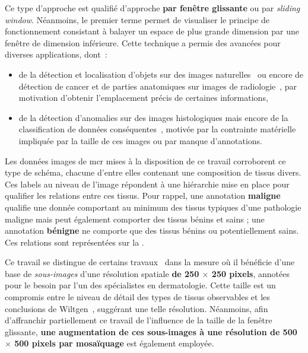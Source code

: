 Ce type d'approche est qualifié d'approche \textbf{par fenêtre glissante} ou par \textit{sliding window}. Néanmoins, le premier terme permet de visualiser le principe de fonctionnement consistant à balayer un espace de plus grande dimension par une fenêtre de dimension inférieure. Cette technique a permis des avancées pour diverses applications, dont~:~
\begin{itemize}
    \item de la détection et localisation d'objets sur des images naturelles~\cite{Harzallah2009} ou encore de détection de cancer et de parties anatomiques sur images de radiologie~\cite{Helwan2017}, par motivation d'obtenir l'emplacement précis de certaines informations,
    \item de la détection d'anomalies sur des images histologiques mais encore de la classification de données conséquentes~\cite{Hou2016,Alqudah2019,Wei2019}, motivée par la contrainte matérielle impliquée par la taille de ces images ou par manque d'annotations.
\end{itemize}\par

Les données images de \gls{mcr} mises à la disposition de ce travail corroborent ce type de schéma, chacune d'entre elles contenant une composition de tissus divers. Ces labels au niveau de l'image répondent à une hiérarchie mise en place pour qualifier les relations entre ces tissus. Pour rappel, une annotation \textbf{maligne} qualifie une donnée comportant au minimum des tissus typiques d'une pathologie maligne mais peut également comporter des tissus bénins et sains ; une annotation \textbf{bénigne} ne comporte que des tissus bénins ou potentiellement sains. Ces relations sont représentées sur la .\par

Ce travail se distingue de certains travaux~\cite{Hou2016,Alqudah2019} dans la mesure où il bénéficie d'une base de \textit{sous-images} d'une résolution spatiale \textbf{de 250 $\times$ 250 pixels}, annotées pour le besoin par l'un des spécialistes en dermatologie. Cette taille est un compromis entre le niveau de détail des types de tissus observables et les conclusions de Wiltgen~, suggérant une telle résolution. Néanmoins, afin d'affranchir partiellement ce travail de l'influence de la taille de la fenêtre glissante, \textbf{une augmentation de ces sous-images à une résolution \textbf{de 500 $\times$ 500 pixels} par mosaïquage} est également employée.\par

